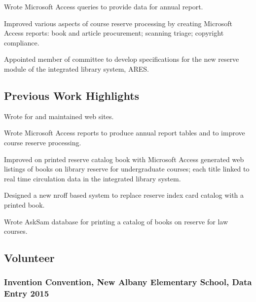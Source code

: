 \documentclass[lettersize,12pt,]{article}
\begin{document}
\begin{compactitem}
\itemsep1pt\parskip0pt

\item Wrote Microsoft Access queries to provide data for annual report.

\item Improved various aspects of course reserve processing by creating Microsoft Access reports: book and article procurement; scanning triage; copyright compliance.

\item Appointed member of committee to develop specifications for the new reserve module of the integrated library system, ARES.

\end{compactitem}




\subsection{Previous Work Highlights}
\begin{compactitem}

\item Wrote for and maintained web sites.

\item Wrote Microsoft Access reports to produce annual report tables and to improve course reserve processing.

\item Improved on printed reserve catalog book with Microsoft Access generated web listings of books on library reserve for undergraduate courses; each title linked to real time circulation data in the integrated library system.

\item Designed a new nroff based system to replace reserve index card catalog with a printed book.

\item Wrote AskSam database for printing a catalog of books on reserve for law courses.

\end{compactitem}

\subsection{Volunteer}\label{volunteer}


\subsubsection{ Invention Convention, New Albany Elementary School, Data Entry \hfill 2015 }
\end{document}
